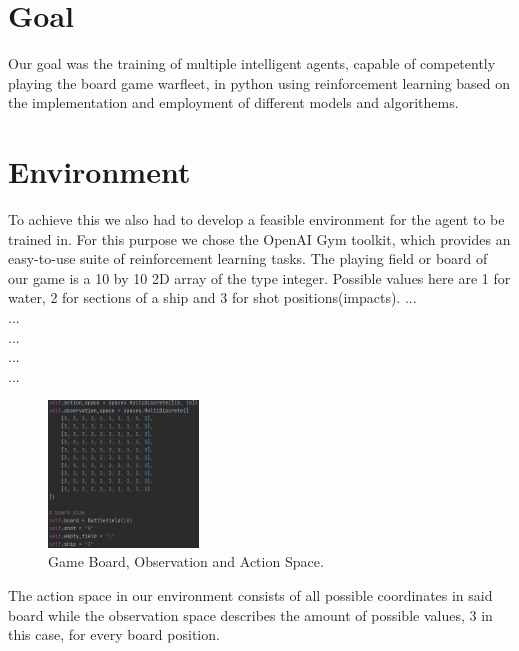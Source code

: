 \documentclass[sigconf]{acmart}
\begin{document}
\section{Goal}
 Our goal was the training of multiple intelligent agents, capable of competently playing the board game warfleet, in python using reinforcement learning based on the implementation and employment of different models and algorithems. 

\section{Environment}
To achieve this we also had to develop a feasible environment for the agent to be trained in. For this purpose we chose the OpenAI Gym toolkit, which provides an easy-to-use suite of reinforcement learning tasks.
The playing field or board of our game is a 10 by 10 2D array of the type integer. Possible values here are 1 for water, 2 for sections of a ship and 3 for shot positions(impacts).
 ...\\
 ...\\
 ...\\
 ...\\
 ...\\


\vspace{5mm} %

\begin{figure}
 \includegraphics[width=40mm]{spaces.png}
  \caption{Game Board, Observation and Action Space.}
  \label{fig:spaces}
\end{figure}

The action space in our environment consists of all possible coordinates in said board while the observation space describes the amount of possible values, 3 in this case, for every board position.

\vfill %
\end{document}
